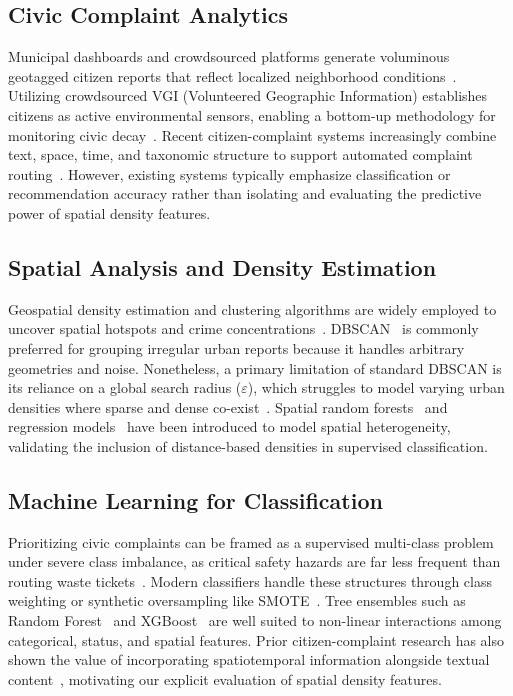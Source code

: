 \documentclass[12pt,onecolumn,draftclsnofoot]{IEEEtran}
\begin{document}
\subsection{Civic Complaint Analytics}

Municipal dashboards and crowdsourced platforms generate voluminous geotagged citizen reports that reflect localized neighborhood conditions~\cite{minkoff2016nyc311,kontokosta2017urban}. Utilizing crowdsourced VGI (Volunteered Geographic Information) establishes citizens as active environmental sensors, enabling a bottom-up methodology for monitoring civic decay~\cite{goodchild2007citizens}. Recent citizen-complaint systems increasingly combine text, space, time, and taxonomic structure to support automated complaint routing~\cite{gao2019star}. However, existing systems typically emphasize classification or recommendation accuracy rather than isolating and evaluating the predictive power of spatial density features.

\subsection{Spatial Analysis and Density Estimation}

Geospatial density estimation and clustering algorithms are widely employed to uncover spatial hotspots and crime concentrations~\cite{silverman1986density,chainey2008utility}. DBSCAN~\cite{ester1996dbscan} is commonly preferred for grouping irregular urban reports because it handles arbitrary geometries and noise. Nonetheless, a primary limitation of standard DBSCAN is its reliance on a global search radius ($\varepsilon$), which struggles to model varying urban densities where sparse and dense co-exist~\cite{cesario2023multidensity}. Spatial random forests~\cite{georganos2021geographical} and regression models~\cite{brunsdon1996geographically} have been introduced to model spatial heterogeneity, validating the inclusion of distance-based densities in supervised classification.

\subsection{Machine Learning for Classification}

Prioritizing civic complaints can be framed as a supervised multi-class problem under severe class imbalance, as critical safety hazards are far less frequent than routing waste tickets~\cite{he2009learning}. Modern classifiers handle these structures through class weighting or synthetic oversampling like SMOTE~\cite{chawla2002smote}. Tree ensembles such as Random Forest~\cite{breiman2001random} and XGBoost~\cite{chen2016xgboost} are well suited to non-linear interactions among categorical, status, and spatial features. Prior citizen-complaint research has also shown the value of incorporating spatiotemporal information alongside textual content~\cite{gao2019star}, motivating our explicit evaluation of spatial density features.
\end{document}
